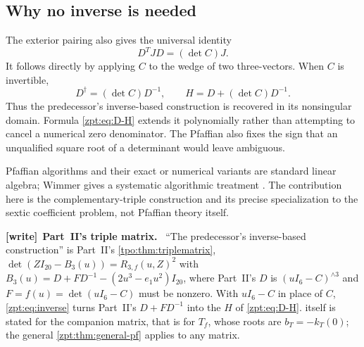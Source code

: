 \documentclass[11pt,letterpaper]{article}
\numberwithin{equation}{section}
\theoremstyle{definition}
\theoremstyle{remark}
\newcommand{\Rthree}{R_{3,f}}
\newenvironment{writenote}[1][]{\par\smallskip\begingroup\small
 \noindent\textbf{[write]}\if\relax\detokenize{#1}\relax\else~\textbf{#1.}\fi\ }%
 {\par\endgroup\smallskip}
\begin{document}
\subsection{Why no inverse is needed}
The exterior pairing also gives the universal identity
\begin{equation}
 D^TJD=(\det C)J.\label{zpt:eq:similitude}
\end{equation}
It follows directly by applying $C$ to the wedge of two three-vectors.
When $C$ is invertible,
\begin{equation}
 D^\dagger=(\det C)D^{-1},\qquad
 H=D+(\det C)D^{-1}.\label{zpt:eq:inverse}
\end{equation}
Thus the predecessor's inverse-based construction is recovered in its
nonsingular domain. Formula \eqref{zpt:eq:D-H} extends it polynomially rather
than attempting to cancel a numerical zero denominator. The Pfaffian also
fixes the sign that an unqualified square root of a determinant would leave
ambiguous.

Pfaffian algorithms and their exact or numerical variants are standard
linear algebra; Wimmer gives a systematic algorithmic treatment
\cite{zpt:wimmer}. The contribution here is the complementary-triple
construction and its precise specialization to the sextic coefficient
problem, not Pfaffian theory itself.

\begin{writenote}[Part~II's triple matrix]
``The predecessor's inverse-based construction'' is Part~II's
\cref{tpo:thm:triplematrix}, $\det(ZI_{20}-B_3(u))=\Rthree(u,Z)^2$ with
$B_3(u)=D+FD^{-1}-(2u^3-e_1u^2)I_{20}$, where Part~II's $D$ is
$(uI_6-C)^{\wedge3}$ and $F=f(u)=\det(uI_6-C)$ must be nonzero. With
$uI_6-C$ in place of $C$, \eqref{zpt:eq:inverse} turns Part~II's $D+FD^{-1}$
into the $H$ of \eqref{zpt:eq:D-H}.  itself is stated for
the companion matrix, that is for $T_f$, whose roots are $b_T=-k_T(0)$; the
general \cref{zpt:thm:general-pf} applies to any matrix.
\end{writenote}
\end{document}

